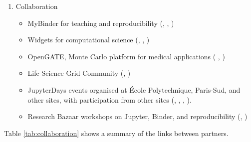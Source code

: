 \begin{enumerate}
\item Collaboration
  \begin{itemize}
  \item MyBinder for teaching and reproducibility (, , )
  \item Widgets for computational science (, , )
  \item OpenGATE, Monte Carlo platform for medical applications (
    , )
  \item Life Science Grid Community (, )
  \item JupyterDays events organised at \'Ecole Polytechnique, Paris-Sud,
  and other sites, with participation from other sites
  (, , , ).
  \item Research Bazaar workshops on Jupyter, Binder, and reproducibility
    (, )
 \end{itemize}
\end{enumerate}

Table \ref{tab:collaboration} shows a summary of the links
between partners.


